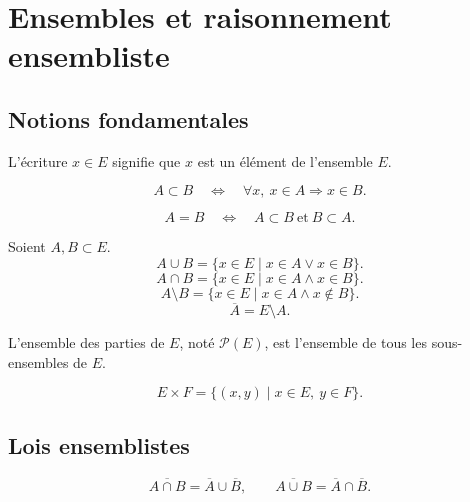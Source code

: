 \documentclass[11pt,a4paper]{article}
\newcommand{\et}{\wedge}
\newcommand{\ou}{\vee}
\newcommand{\imp}{\Rightarrow}
\newcommand{\ssi}{\Longleftrightarrow}
\begin{document}
\section{Ensembles et raisonnement ensembliste}

\subsection{Notions fondamentales}

\begin{definitionbox}[appartenance]
L'écriture \(x\in E\) signifie que \(x\) est un élément de l'ensemble \(E\).
\end{definitionbox}

\begin{definitionbox}[inclusion]
\[
A\subset B\quad\ssi\quad \forall x,\ x\in A\imp x\in B.
\]
\end{definitionbox}

\begin{definitionbox}
\[
A=B\quad\ssi\quad A\subset B\ \text{et}\ B\subset A.
\]
\end{definitionbox}

\begin{definitionbox}
Soient \(A,B\subset E\).
\[
A\cup B=\{x\in E\mid x\in A\ou x\in B\}.
\]
\[
A\cap B=\{x\in E\mid x\in A\et x\in B\}.
\]
\[
A\setminus B=\{x\in E\mid x\in A\et x\notin B\}.
\]
\[
\overline A=E\setminus A.
\]
\end{definitionbox}

\begin{definitionbox}
L'ensemble des parties de \(E\), noté \(\mathcal P(E)\), est l'ensemble de tous les sous-ensembles de \(E\).
\end{definitionbox}

\begin{definitionbox}
\[
E\times F=\{(x,y)\mid x\in E,\ y\in F\}.
\]
\end{definitionbox}

\subsection{Lois ensemblistes}

\begin{propositionbox}[De Morgan]
\[
\overline{A\cap B}=\overline A\cup\overline B,
\qquad
\overline{A\cup B}=\overline A\cap\overline B.
\]
\end{propositionbox}
\end{document}
